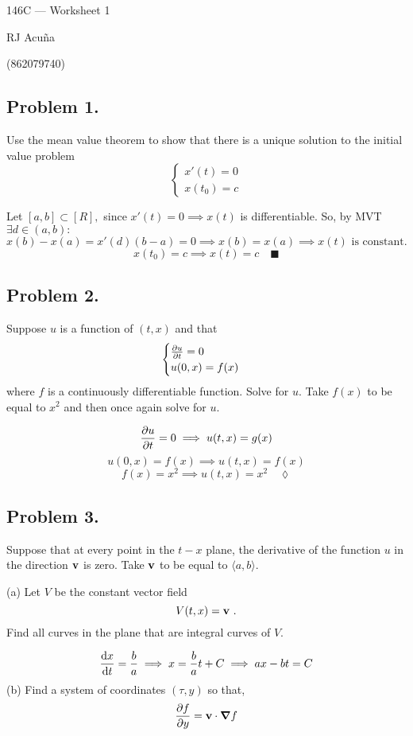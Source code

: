 \documentclass{article}
\begin{document}
\begin{center}
  146C --- Worksheet 1

  RJ Acuña

  (862079740)
\end{center}\vspace{1.618em}

\subsection*{Problem 1.} Use the mean value theorem to show that there is a unique solution to the initial
value problem \[\begin{cases}x'(t) = 0 \\ x(t_0) = c \end{cases}\]


Let $[a,b]\subset [R],$ since $x'(t)= 0\implies x(t)$ is
differentiable. So, by MVT $\exists d\in (a,b):$\[x(b)-x(a) =
  x'(d)(b-a) = 0 \implies x(b)= x(a) \implies x(t)\text{ is constant.}\]
\[x(t_0)= c\implies x(t)= c\quad \blacksquare\]

\subsection*{Problem 2.} Suppose $u$ is a function of $(t,x)$ and that
\[\begin{cases}\pdv{u}{t} = 0 \\ u(0,x) = f(x) \end{cases}\]where $f$ is a continuously differentiable function. Solve for $u$. Take $f (x)$ to be equal to $x^2$ and
then once again solve for $u$.


\[\pdv{u}{t}= 0 \implies u(t,x) = g(x)\]
\[u(0,x) = f(x)\implies u(t,x) = f(x)\]
\[f(x) = x^2 \implies u(t,x) = x^2\quad \lozenge\]

\subsection*{Problem 3.} Suppose that at every point in the $t-x$ plane, the derivative of the function $u$ in
the direction $\vb{v}$ is zero. Take $\vb{v}$ to be equal to $\langle   a,
b \rangle $.

(a) Let $V$ be the constant vector field
\[V(t,x) = \vb{v}\text{ .}\]
Find all curves in the plane that are integral curves of $V$.

\[\dv{x}{t} = \frac{b}{a}\implies x = \frac{b}{a}t + C \implies ax
  - bt  = C \]
\newpage
(b) Find a system of coordinates $(τ, y)$ so that,
\[\pdv{f}{y} = \vb{v}\cdot \grad{f}\]
\end{document}
